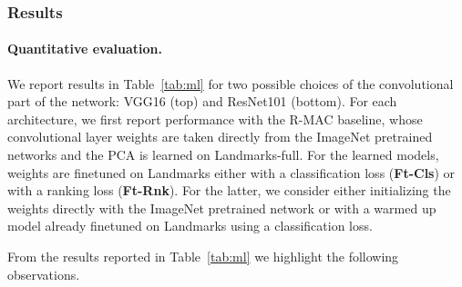 \documentclass[twocolumn]{svjour3}          \smartqed  \usepackage{graphicx}
\begin{document}
\subsubsection{Results}



\paragraph{Quantitative evaluation.} We report results in Table~\ref{tab:ml} for two possible choices of the convolutional part of the network: VGG16 (top) and ResNet101 (bottom).
For each architecture, we first report performance with the R-MAC baseline, whose convolutional layer weights are taken directly from the ImageNet pretrained networks and the PCA is learned on Landmarks-full.
For the learned models, weights are finetuned on Landmarks either with a classification loss (\textbf{Ft-Cls}) or with a ranking loss (\textbf{Ft-Rnk}).
For the latter, we consider either initializing the weights directly with the ImageNet pretrained network or with a warmed up model already finetuned on Landmarks using a classification loss.  

From the results reported in Table~\ref{tab:ml} we highlight the following observations. 
\end{document}
